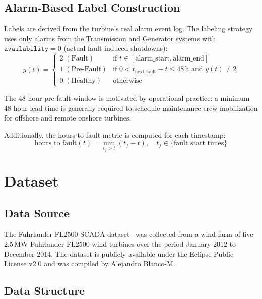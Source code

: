 \documentclass[preprint,12pt]{elsarticle}
\begin{document}
\subsection{Alarm-Based Label Construction}
\label{sec:labels}

Labels are derived from the turbine's real alarm event log. The labeling strategy uses only alarms from the Transmission and Generator systems with $\texttt{availability} = 0$ (actual fault-induced shutdowns):
\begin{equation}
    y(t) = \begin{cases}
    2 \; (\text{Fault}) & \text{if } t \in [\text{alarm\_start}, \text{alarm\_end}] \\
    1 \; (\text{Pre-Fault}) & \text{if } 0 < t_{\text{next\_fault}} - t \leq 48\,\text{h and } y(t) \neq 2 \\
    0 \; (\text{Healthy}) & \text{otherwise}
    \end{cases}
\end{equation}

The 48-hour pre-fault window is motivated by operational practice: a minimum 48-hour lead time is generally required to schedule maintenance crew mobilization for offshore and remote onshore turbines.

Additionally, the hours-to-fault metric is computed for each timestamp:
\begin{equation}
    \text{hours\_to\_fault}(t) = \min_{t_f > t} (t_f - t), \quad t_f \in \{\text{fault start times}\}
\end{equation}

\section{Dataset}
\label{sec:dataset}

\subsection{Data Source}

The Fuhrlander FL2500 SCADA dataset~\cite{blanco2020} was collected from a wind farm of five 2.5\,MW Fuhrlander FL2500 wind turbines over the period January 2012 to December 2014. The dataset is publicly available under the Eclipse Public License v2.0 and was compiled by Alejandro Blanco-M.

\subsection{Data Structure}
\end{document}
